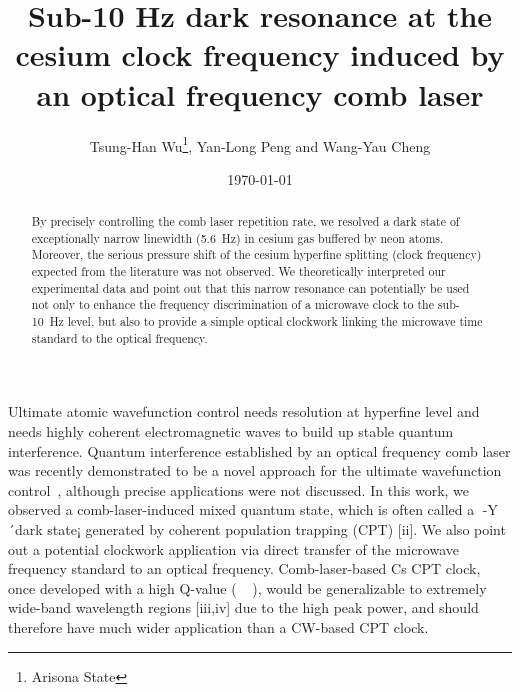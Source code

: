 



\draft

\title{Sub-10 Hz dark resonance at the cesium clock frequency induced by an optical frequency comb laser}

\author{
Tsung-Han Wu\footnote[*]{Arisona State}, Yan-Long Peng and Wang-Yau Cheng\cite{wangyau-email}
}

\address{
Institute of Atomic and Molecular Sciences, Academia Sinica, Taiwan, R.O.C.
}

\date{\today}

\maketitle


\begin{abstract}
By precisely controlling the comb laser repetition rate, we
resolved a dark state of exceptionally narrow linewidth (5.6~Hz)
in cesium gas buffered by neon atoms. Moreover, the serious
pressure shift of the cesium hyperfine splitting (clock frequency)
expected from the literature was not observed. We theoretically
interpreted our experimental data and point out that this narrow
resonance can potentially be used not only to enhance the frequency 
discrimination of a microwave clock to the sub-10~Hz level, but also to
provide a simple optical clockwork linking the microwave time standard
to the optical frequency.
\end{abstract}



\narrowtext
Ultimate atomic wavefunction control needs resolution at hyperfine level and needs highly coherent electromagnetic waves to build up stable quantum interference. Quantum interference established by an optical frequency comb laser was recently demonstrated to be a novel approach for the ultimate wavefunction control~\cite{Stowe2008}, although precise applications were not discussed. In this work, we observed a comb-laser-induced mixed quantum state, which is often called a -Y´dark state¡ generated by coherent population trapping (CPT) [ii]. We also point out a potential clockwork application via direct transfer of the microwave frequency standard to an optical frequency. Comb-laser-based Cs CPT clock, once developed with a high Q-value (), would be generalizable to extremely wide-band wavelength regions [iii,iv] due to the high peak power, and should therefore have much wider application than a CW-based CPT clock.
    

